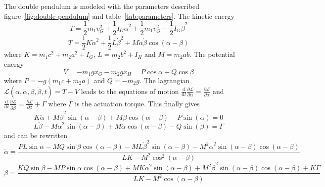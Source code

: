 \documentclass[a4paper,10pt]{article}
\newcommand{\dd}{\ensuremath{\text{d}}}
\begin{document}
The double pendulum is modeled with the parameters described figure~\ref{fig:double-pendulum} and table~\ref{tab:parameters}. The kinetic energy
$$ T = \frac{1}{2} m_1 v_G^2 + \frac{1}{2} I_G \dot{\alpha}^2 + \frac{1}{2} m_1 v_G^2 + \frac{1}{2} I_G \dot{\beta}^2 $$
$$ T = \frac{1}{2} K \dot{\alpha}^2 + \frac{1}{2} L \dot{\beta}^2 + M \dot{\alpha} \dot{\beta} \cos(\alpha-\beta) $$
where $K = m_1 c^2 + m_2 a^2 + I_G$, $L = m_2 b^2 + I_H$ and $M = m_2 a b$. The potential energy
$$ V = -m_1 g x_G - m_2 g x_H = P\cos\alpha + Q\cos\beta $$
where $P = -g(m_1 c + m_2 a)$ and $Q = - m_2 g$. The lagrangian $\mathscr{L}(\alpha, \dot{\alpha}, \beta, \dot{\beta}, t) = T-V$ leads to the equations of motion $\frac{\dd}{\dd t} \frac{\partial \mathscr{L}}{\partial \dot{\alpha}} = \frac{\partial \mathscr{L}}{\partial \alpha}$ and $\frac{\dd}{\dd t} \frac{\partial \mathscr{L}}{\partial \dot{\beta}} = \frac{\partial \mathscr{L}}{\partial \beta}+\Gamma$ where $\Gamma$ is the actuation torque. This finally gives
$$ K \ddot{\alpha} + M \dot{\beta}^2\sin(\alpha-\beta) + M \ddot{\beta}\cos(\alpha-\beta) - P \sin(\alpha) = 0 $$
$$ L \ddot{\beta} - M \dot{\alpha}^2\sin(\alpha-\beta) + M \ddot{\alpha}\cos(\alpha-\beta) - Q \sin(\beta) = \Gamma $$
and can be rewritten
$$ \ddot{\alpha} = \frac{PL\sin\alpha-MQ\sin\beta\cos(\alpha-\beta)-ML\dot{\beta}^2\sin(\alpha-\beta)-M^2\dot{\alpha}^2\sin(\alpha-\beta)\cos(\alpha-\beta)}{LK-M^2\cos^2(\alpha-\beta)} $$
$$ \ddot{\beta} = \frac{KQ\sin\beta-MP\sin\alpha\cos(\alpha-\beta)+MK\dot{\alpha}^2\sin(\alpha-\beta)+M^2\dot{\beta}^2\sin(\alpha-\beta)\cos(\alpha-\beta)+K\Gamma}{LK-M^2\cos(\alpha-\beta)} $$
\end{document}
